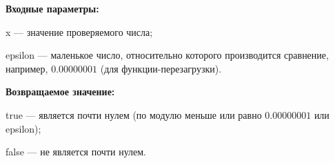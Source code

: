 \textbf{Входные параметры:}

 x --- значение проверяемого числа;
	
 epsilon --- маленькое число, относительно которого производится сравнение, например, $0.00000001$ (для функции-перезагрузки).

\textbf{Возвращаемое значение:}

 true --- является почти нулем (по модулю меньше или равно $0.00000001$ или epsilon);
 
 false --- не является почти нулем.